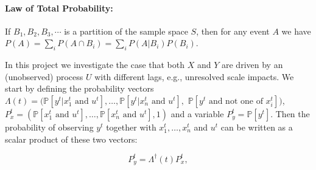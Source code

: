 \documentclass[a0,portrait]{a0poster}
\def\bP{\mathbb{P}}
\begin{document}
\begin{multicols}{2}
\paragraph{\large Law of Total Probability:} 
  {\large If $B_1, B_2, B_3,\cdots$ is a partition of the sample space $S$, then for any event $A$ we have $P(A)=\sum_{i} P(A \cap B_i)=\sum_{i} P(A | B_i) P(B_i)$. }

\vspace{0.5cm}
\noindent
{\large In this project we investigate the case that both $X$ and $Y$ are driven by an (unobserved) process $U$ with different lags, e.g., unresolved scale impacts. We start by defining the probability vectors $\Lambda(t)=(\bP\left[y^t|x_1^t \text{ and } u^t \right],\dots,\bP\left[y^t|x_n^t \text{ and } u^t\right],$ $ \bP[y^t \text{  and not one of } x_i^t])$,  $P_x^t=\left(\bP\left[x_1^t \text{ and } u^t \right],\dots,\bP\left[x_n^t \text{ and } u^t \right],1\right)$ and a variable $P^t_y=\bP\left[y^t \right] $. Then the probability of observing $y^t$ together with $x_1^t,\dots,x_n^t$ and $u^t$ can be written as a scalar product of these two vectors:}

\begin{equation}
\label{eq:full_prob}
P_y^t = \Lambda^{\dagger}(t)P^t_x,
\end{equation}


\end{multicols}
\end{document}
